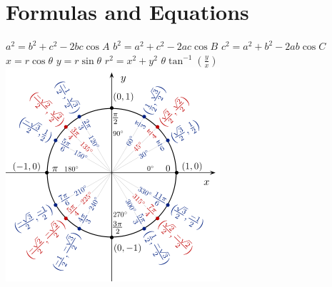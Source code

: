 \documentclass[../main.tex]{subfiles}
\begin{document}
\section*{Formulas and Equations}
$a^2 = b^2 + c^2 -2bc \cos A$
\newline
$b^2 = a^2 + c^2 -2ac \cos B$
\newline
$c^2 = a^2 + b^2 -2ab \cos C$
\newline
$x = r\cos\theta$
\newline
$y = r\sin\theta$
\newline
$r^2 = x^2 + y^2$
\newline
$\theta \tan^{-1} (\frac{y}{x})$ 
\newline
\includegraphics[scale = 0.9]{unitcircle.png}
\end{document}
